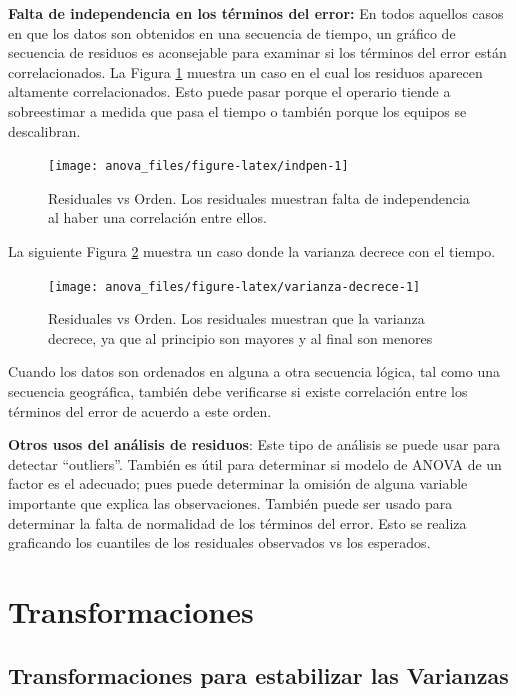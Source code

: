 \documentclass[]{book}
\theoremstyle{definition}
\theoremstyle{definition}
\theoremstyle{definition}
\theoremstyle{remark}
\begin{document}
\textbf{Falta de independencia en los términos del error:} En todos
aquellos casos en que los datos son obtenidos en una secuencia de
tiempo, un gráfico de secuencia de residuos es aconsejable para examinar
si los términos del error están correlacionados. La Figura
\ref{fig:indpen} muestra un caso en el cual los residuos aparecen
altamente correlacionados. Esto puede pasar porque el operario tiende a
sobreestimar a medida que pasa el tiempo o también porque los equipos se
descalibran.




\begin{figure}
\texttt{[image: anova\_files/figure-latex/indpen-1]} \caption{Residuales vs Orden. Los residuales muestran falta de
independencia al haber una correlación entre ellos.}\label{fig:indpen}
\end{figure}

La siguiente Figura \ref{fig:varianza-decrece} muestra un caso donde la
varianza decrece con el tiempo.





\begin{figure}
\texttt{[image: anova\_files/figure-latex/varianza-decrece-1]} \caption{Residuales vs Orden. Los residuales muestran que
la varianza decrece, ya que al principio son mayores y al final son
menores}\label{fig:varianza-decrece}
\end{figure}

Cuando los datos son ordenados en alguna a otra secuencia lógica, tal
como una secuencia geográfica, también debe verificarse si existe
correlación entre los términos del error de acuerdo a este orden.

\textbf{Otros usos del análisis de residuos}: Este tipo de análisis se
puede usar para detectar ``outliers''. También es útil para determinar
si modelo de ANOVA de un factor es el adecuado; pues puede determinar la
omisión de alguna variable importante que explica las observaciones.
También puede ser usado para determinar la falta de normalidad de los
términos del error. Esto se realiza graficando los cuantiles de los
residuales observados vs los esperados.

\hypertarget{transformaciones}{%
\section{Transformaciones}\label{transformaciones}}

\hypertarget{transformaciones-para-estabilizar-las-varianzas}{%
\subsection{Transformaciones para estabilizar las
Varianzas}\label{transformaciones-para-estabilizar-las-varianzas}}
\end{document}
